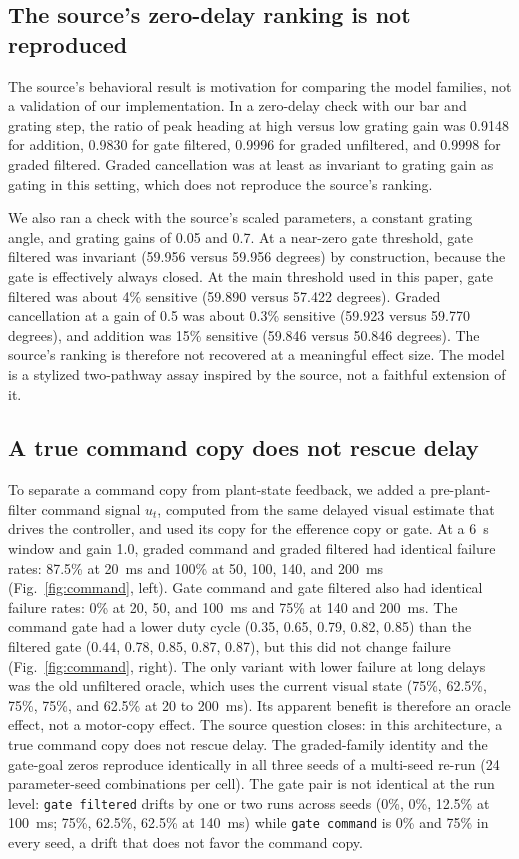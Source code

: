 \documentclass[pdflatex,sn-nature]{sn-jnl}
\begin{document}
\subsection{The source's zero-delay ranking is not reproduced}

The source's behavioral result is motivation for comparing the model families, not a validation of our implementation. In a zero-delay check with our bar and grating step, the ratio of peak heading at high versus low grating gain was 0.9148 for addition, 0.9830 for gate filtered, 0.9996 for graded unfiltered, and 0.9998 for graded filtered. Graded cancellation was at least as invariant to grating gain as gating in this setting, which does not reproduce the source's ranking.

We also ran a check with the source's scaled parameters, a constant grating angle, and grating gains of 0.05 and 0.7. At a near-zero gate threshold, gate filtered was invariant (59.956 versus 59.956 degrees) by construction, because the gate is effectively always closed. At the main threshold used in this paper, gate filtered was about 4\% sensitive (59.890 versus 57.422 degrees). Graded cancellation at a gain of 0.5 was about 0.3\% sensitive (59.923 versus 59.770 degrees), and addition was 15\% sensitive (59.846 versus 50.846 degrees). The source's ranking is therefore not recovered at a meaningful effect size. The model is a stylized two-pathway assay inspired by the source, not a faithful extension of it.

\subsection{A true command copy does not rescue delay}

To separate a command copy from plant-state feedback, we added a pre-plant-filter command signal $u_t$, computed from the same delayed visual estimate that drives the controller, and used its copy for the efference copy or gate. At a 6~s window and gain 1.0, graded command and graded filtered had identical failure rates: 87.5\% at 20~ms and 100\% at 50, 100, 140, and 200~ms (Fig.~\ref{fig:command}, left). Gate command and gate filtered also had identical failure rates: 0\% at 20, 50, and 100~ms and 75\% at 140 and 200~ms. The command gate had a lower duty cycle (0.35, 0.65, 0.79, 0.82, 0.85) than the filtered gate (0.44, 0.78, 0.85, 0.87, 0.87), but this did not change failure (Fig.~\ref{fig:command}, right). The only variant with lower failure at long delays was the old unfiltered oracle, which uses the current visual state (75\%, 62.5\%, 75\%, 75\%, and 62.5\% at 20 to 200~ms). Its apparent benefit is therefore an oracle effect, not a motor-copy effect. The source question closes: in this architecture, a true command copy does not rescue delay. The graded-family identity and the gate-goal zeros reproduce identically in all three seeds of a multi-seed re-run (24 parameter-seed combinations per cell). The gate pair is not identical at the run level: \texttt{gate filtered} drifts by one or two runs across seeds (0\%, 0\%, 12.5\% at 100~ms; 75\%, 62.5\%, 62.5\% at 140~ms) while \texttt{gate command} is 0\% and 75\% in every seed, a drift that does not favor the command copy.
\end{document}
